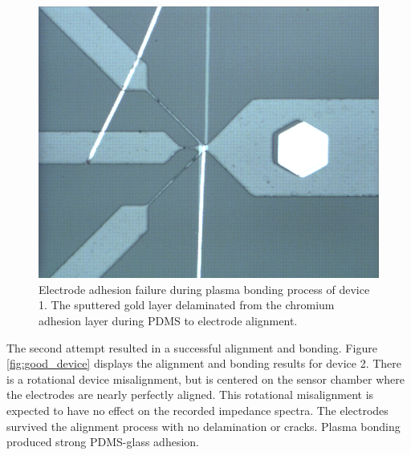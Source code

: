 \begin{figure}[h]
    \centering
    \includegraphics[width=\textwidth]{images/bad_device.png}
    \caption{Electrode adhesion failure during plasma bonding process of device 1. The sputtered gold layer delaminated from the chromium adhesion layer during PDMS to electrode alignment.}
    \label{fig:bad_device}
\end{figure}

\par The second attempt resulted in a successful alignment and bonding. Figure \ref{fig:good_device} displays the alignment and bonding results for device 2. There is a rotational device misalignment, but is centered on the sensor chamber where the electrodes are nearly perfectly aligned. This rotational misalignment is expected to have no effect on the recorded impedance spectra. The electrodes survived the alignment process with no delamination or cracks. Plasma bonding produced  strong PDMS-glass adhesion. 

